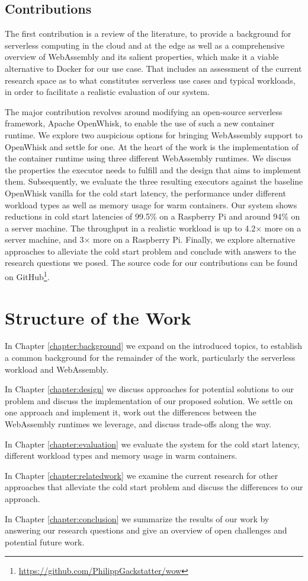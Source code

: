 \subsection{Contributions}

The first contribution is a review of the literature, to provide a background for serverless computing in the cloud and at the edge as well as a comprehensive overview of WebAssembly and its salient properties, which make it a viable alternative to Docker for our use case. That includes an assessment of the current research space as to what constitutes serverless use cases and typical workloads, in order to facilitate a realistic evaluation of our system.

The major contribution revolves around modifying an open-source serverless framework, Apache OpenWhisk, to enable the use of such a new container runtime. We explore two auspicious options for bringing WebAssembly support to OpenWhisk and settle for one. At the heart of the work is the implementation of the container runtime using three different WebAssembly runtimes. We discuss the properties the executor needs to fulfill and the design that aims to implement them. Subsequently, we evaluate the three resulting executors against the baseline OpenWhisk vanilla for the cold start latency, the performance under different workload types as well as memory usage for warm containers.
Our system shows reductions in cold start latencies of 99.5\% on a Raspberry Pi and around 94\% on a server machine. The throughput in a realistic workload is up to 4.2$\times$ more on a server machine, and 3$\times$ more on a Raspberry Pi.
Finally, we explore alternative approaches to alleviate the cold start problem and conclude with answers to the research questions we posed.
The source code for our contributions can be found on GitHub\footnote{\url{https://github.com/PhilippGackstatter/wow}}.


\section{Structure of the Work}

In Chapter \ref{chapter:background} we expand on the introduced topics, to establish a common background for the remainder of the work, particularly the serverless workload and WebAssembly.

In Chapter \ref{chapter:design} we discuss approaches for potential solutions to our problem and discuss the implementation of our proposed solution. We settle on one approach and implement it, work out the differences between the WebAssembly runtimes we leverage, and discuss trade-offs along the way.

In Chapter \ref{chapter:evaluation} we evaluate the system for the cold start latency, different workload types and memory usage in warm containers.

In Chapter \ref{chapter:relatedwork} we examine the current research for other approaches that alleviate the cold start problem and discuss the differences to our approach.

In Chapter \ref{chapter:conclusion} we summarize the results of our work by answering our research questions and give an overview of open challenges and potential future work.